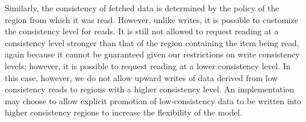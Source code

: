 \documentclass[preprint,numbers]{sigplanconf}
\begin{document}
Similarly, the consistency of fetched data is determined by the
policy of the region from which it was read. However, unlike writes, it is possible to
customize the consistency level for reads. It is still not allowed to request reading
at a consistency level stronger than that of the region containing the item
being read, again because it cannot be guaranteed given our restrictions on
write consistency levels; however, it is possible to
request reading at a lower consistency level.
In this case, however, we do not allow
upward writes of data derived from low
consistency reads to regions with a higher consistency level.
An implementation may choose to
allow explicit promotion of low-consistency data to be written into higher
consistency regions to increase the flexibility of the model.

%

\end{document}
